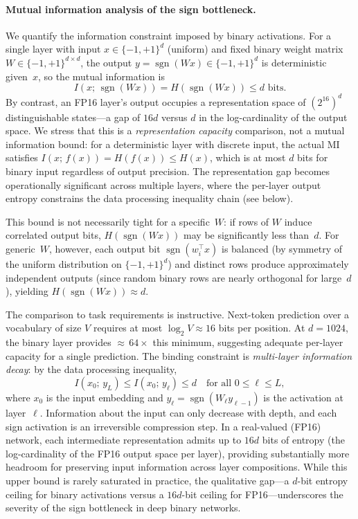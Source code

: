 \documentclass[12pt,a4paper]{article}
\theoremstyle{plain}
\theoremstyle{definition}
\theoremstyle{remark}
\newcommand{\pmone}{\{-1,+1\}}
\newcommand{\sgn}{\operatorname{sgn}}
\begin{document}
\paragraph{Mutual information analysis of the sign bottleneck.}
We quantify the information constraint imposed by binary activations.
For a single layer with input $x \in \pmone^d$ (uniform) and fixed binary weight matrix $W \in \pmone^{d \times d}$, the output $y = \sgn(Wx) \in \pmone^d$ is deterministic given~$x$, so the mutual information is
\begin{equation}\label{eq:sign-mi}
  I(x;\, \sgn(Wx)) = H(\sgn(Wx)) \leq d \text{ bits}.
\end{equation}
By contrast, an FP16 layer's output occupies a representation space of $(2^{16})^d$ distinguishable states---a gap of $16d$ versus $d$ in the log-cardinality of the output space. We stress that this is a \emph{representation capacity} comparison, not a mutual information bound: for a deterministic layer with discrete input, the actual MI satisfies $I(x;\, f(x)) = H(f(x)) \leq H(x)$, which is at most $d$ bits for binary input regardless of output precision. The representation gap becomes operationally significant across multiple layers, where the per-layer output entropy constrains the data processing inequality chain (see below).

This bound is not necessarily tight for a specific~$W$: if rows of $W$ induce correlated output bits, $H(\sgn(Wx))$ may be significantly less than~$d$.
For generic~$W$, however, each output bit $\sgn(w_i^\top x)$ is balanced (by symmetry of the uniform distribution on $\pmone^d$) and distinct rows produce approximately independent outputs (since random binary rows are nearly orthogonal for large~$d$), yielding $H(\sgn(Wx)) \approx d$.

The comparison to task requirements is instructive.
Next-token prediction over a vocabulary of size $V$ requires at most $\log_2 V \approx 16$ bits per position.
At $d = 1024$, the binary layer provides ${\approx}\,64\times$ this minimum, suggesting adequate per-layer capacity for a single prediction.
The binding constraint is \emph{multi-layer information decay}: by the data processing inequality,
\begin{equation}\label{eq:dpi-layers}
  I(x_0;\, y_L) \leq I(x_0;\, y_\ell) \leq d \quad \text{for all } 0 \leq \ell \leq L,
\end{equation}
where $x_0$ is the input embedding and $y_\ell = \sgn(W_\ell y_{\ell-1})$ is the activation at layer~$\ell$.
Information about the input can only decrease with depth, and each sign activation is an irreversible compression step.
In a real-valued (FP16) network, each intermediate representation admits up to $16d$ bits of entropy (the log-cardinality of the FP16 output space per layer), providing substantially more headroom for preserving input information across layer compositions. While this upper bound is rarely saturated in practice, the qualitative gap---a $d$-bit entropy ceiling for binary activations versus a $16d$-bit ceiling for FP16---underscores the severity of the sign bottleneck in deep binary networks.
\end{document}
